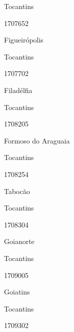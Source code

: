 \documentclass[
  letterpaper,
]{report}
\begin{document}
\n    

\n      

Tocantins

\n      

1707652

\n      

Figueirópolis

\n    

\n    

\n      

Tocantins

\n      

1707702

\n      

Filadélfia

\n    

\n    

\n      

Tocantins

\n      

1708205

\n      

Formoso do Araguaia

\n    

\n    

\n      

Tocantins

\n      

1708254

\n      

Tabocão

\n    

\n    

\n      

Tocantins

\n      

1708304

\n      

Goianorte

\n    

\n    

\n      

Tocantins

\n      

1709005

\n      

Goiatins

\n    

\n    

\n      

Tocantins

\n      

1709302
\end{document}
